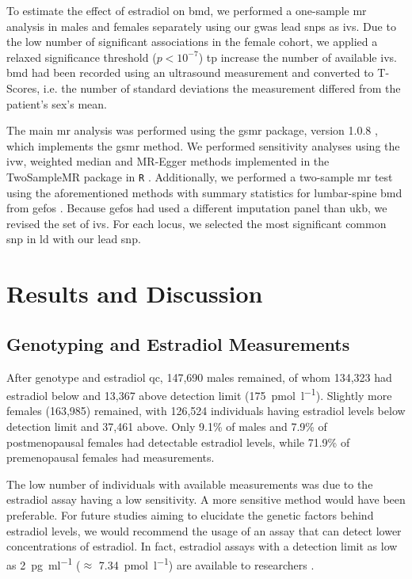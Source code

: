 \documentclass[twoside=false]{scrbook}
\begin{document}
To estimate the effect of estradiol on \gls{bmd}, we performed a one-sample \gls{mr} analysis in males and females separately using our \gls{gwas} lead \glspl{snp} as \glspl{iv}.
Due to the low number of significant associations in the female cohort, we applied a relaxed significance threshold ($p < 10^{-7}$) tp increase the number of available \glspl{iv}.
\Gls{bmd} had been recorded using an ultrasound measurement and converted to T-Scores, i.e. the number of standard deviations the measurement differed from the patient's sex's mean. 

The main \gls{mr} analysis was performed using the \textsf{gsmr} package, version 1.0.8 \cite{Zhu2018}, which implements the \gls{gsmr} method.
We performed sensitivity analyses using the \gls{ivw}, weighted median and MR-Egger methods implemented in the \textsf{TwoSampleMR} package in \texttt{R} \cite{Hemani2018}.
Additionally, we performed a two-sample \gls{mr} test using the aforementioned methods with summary statistics for lumbar-spine \gls{bmd} from \gls{gefos} \cite{Estrada2012}.
Because \gls{gefos} had used a different imputation panel than \gls{ukb}, we revised the set of \glspl{iv}.
For each locus, we selected the most significant common \gls{snp} in \gls{ld} with our lead \gls{snp}.

\section{Results and Discussion}
\label{sec:p1discussion}
\subsection{Genotyping and Estradiol Measurements}
After genotype and estradiol \gls{qc}, 147,690 males remained, of whom 134,323 had estradiol below and 13,367 above detection limit (\qty{175}{\pmol\per\l}).
Slightly more females (163,985) remained, with 126,524 individuals having estradiol levels below detection limit and 37,461 above.
Only 9.1\% of males and 7.9\% of postmenopausal females had detectable estradiol levels, while 71.9\% of premenopausal females had measurements.

The low number of individuals with available measurements was due to the estradiol assay having a low sensitivity.
A more sensitive method would have been preferable.
For future studies aiming to elucidate the genetic factors behind estradiol levels, we would recommend the usage of an assay that can detect lower concentrations of estradiol.
In fact, estradiol assays with a detection limit as low as \qty{2}{\pg\per\ml} ($\approx$ \qty{7.34}{\pmol\per\l}) are available to researchers \cite{Travison2014}.
\end{document}
